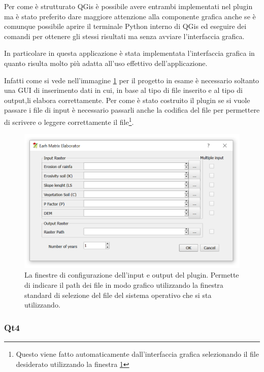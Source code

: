 Per come è strutturato QGis è possibile avere entrambi implementati nel plugin ma è stato preferito dare maggiore attenzione alla componente grafica anche se è comunque possibile aprire il terminale Python interno di QGis ed eseguire dei comandi per ottenere gli stessi risultati ma senza avviare l'interfaccia grafica.

In particolare in questa applicazione è stata implementata l'interfaccia grafica in quanto risulta molto più adatta all'uso effettivo dell'applicazione.

Infatti come si vede nell'immagine \ref{fig:screen1} per il progetto in esame è necessario soltanto una GUI di inserimento dati in cui, in base al tipo di file inserito e al tipo di output,li elabora correttamente. Per come è stato costruito il plugin se si vuole passare i file di input è necessario passarli anche la codifica del file per permettere di scrivere o leggere correttamente il file\footnote{Questo viene fatto automaticamente dall'interfaccia grafica selezionando il file desiderato utilizzando la finestra \ref{fig:screen1}}.

\begin{figure}[h]
	\centering
	\includegraphics[width=\linewidth]{Capitoli/img/interfaccia.png}
	\caption{La finestre di configurazione dell'input e output del plugin. Permette di indicare il path dei file in modo grafico utilizzando la finestra standard di selezione del file del sistema operativo che si sta utilizzando.}
	\label{fig:screen1}
\end{figure}

\subsubsection{Qt4}

